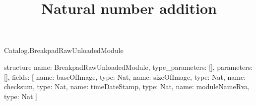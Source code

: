 \begin{lexlean}{Catalog.BreakpadRawUnloadedModule}
\title{Natural number addition}
\begin{semanticmodule}
structure{
  name: BreakpadRawUnloadedModule,
  type_parameters: [],
  parameters: [],
  fields: [
    {name: baseOfImage, type: Nat},
    {name: sizeOfImage, type: Nat},
    {name: checksum, type: Nat},
    {name: timeDateStamp, type: Nat},
    {name: moduleNameRva, type: Nat}
  ]
}
\end{semanticmodule}
\end{lexlean}
